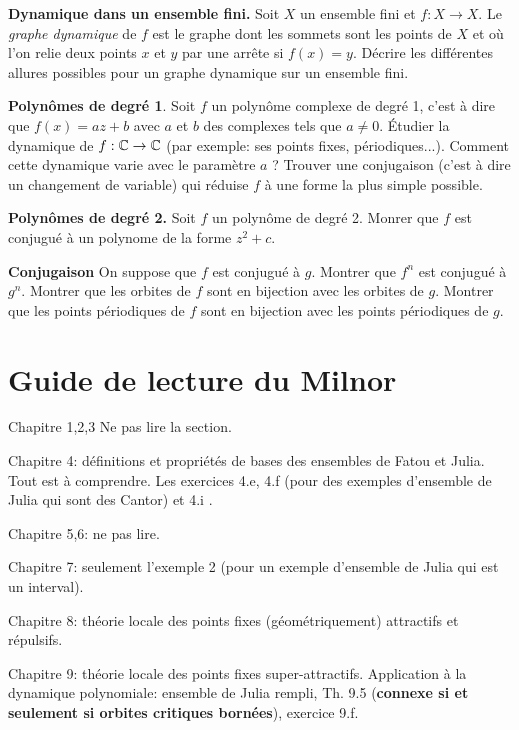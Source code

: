 \documentclass{article}
\begin{document}
\textbf{Dynamique dans un ensemble fini.}
Soit $ X $ un ensemble fini
et $ f : X \to X $.
Le \emph{graphe dynamique}
de $ f $ est le graphe
dont les sommets sont les points de $ X $
et où l'on relie deux points
$ x $ et $ y $ par une arrête si
$ f(x) = y $.
Décrire les différentes allures
possibles pour un graphe dynamique
sur un ensemble fini.

\textbf{Polynômes de degré 1}.
Soit $ f $ un polynôme complexe de degré 1,
c'est à dire que
$ f(x) = az + b $
avec $ a $ et $ b $
des complexes tels que
$ a \neq 0 $.
Étudier la dynamique
de
$ f : \mathbb{C} \to \mathbb{C} $
(par exemple: ses points fixes, périodiques...).
Comment cette dynamique varie avec le paramètre
$ a $ ?
Trouver une conjugaison
(c'est à dire un changement de variable)
qui réduise $ f $ à une forme la plus simple
possible.

\textbf{Polynômes de degré 2.}
Soit $ f $
un polynôme de degré 2.
Monrer que $ f $
est conjugué à un polynome
de la forme
$ z^2 + c $.

\textbf{Conjugaison}
On suppose
que $ f $
est conjugué à
$ g $.
Montrer que $ f^n $
est conjugué à
$ g^{n} $.
Montrer que les orbites
de $ f $
sont en bijection
avec les orbites de $ g $.
Montrer que les points périodiques
de $ f $
sont en bijection
avec les points périodiques de $ g $.


\section{Guide de lecture du Milnor}

Chapitre 1,2,3
Ne pas lire la section.

Chapitre 4: définitions et propriétés de bases
des ensembles de Fatou et Julia.
Tout est à comprendre.
Les exercices 4.e, 4.f (pour des exemples d'ensemble de Julia qui sont des
Cantor) et 4.i .

Chapitre 5,6: ne pas lire.

Chapitre 7: seulement l'exemple 2 (pour un exemple d'ensemble de Julia qui est un
interval).

Chapitre 8: théorie locale des points fixes (géométriquement) attractifs et
répulsifs.

Chapitre 9: 
théorie locale des points fixes super-attractifs.
Application à la dynamique polynomiale: ensemble de Julia rempli, Th. 9.5
(\textbf{connexe si et seulement si orbites critiques bornées}), exercice 9.f.
\end{document}
